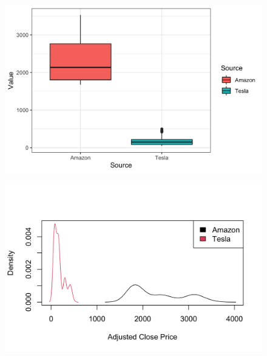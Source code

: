\documentclass[10pt,leter,openany]{article}
\begin{document}
		\begin{figure}
			\begin{center}
				\includegraphics[scale=0.21]{extras/boxplot_stocks}
				\label{fig:box1}
			\end{center}
		\end{figure}

		\begin{figure}
			\begin{center}
				\includegraphics[scale=0.21]{extras/dens}
				\label{fig:dens1}
			\end{center}
		\end{figure}
		
\end{document}
